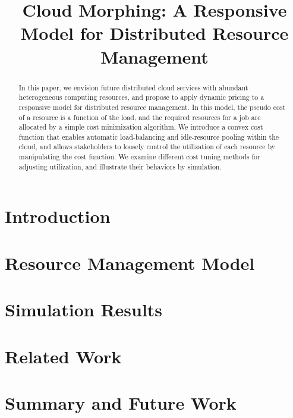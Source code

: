 \documentclass[10pt,sigconf,letterpaper,anonymous,nonacm]{acmart}
\title{Cloud Morphing: A Responsive Model for Distributed Resource Management}
\begin{document}
\begin{abstract}

    In this paper, we envision future distributed cloud services with
    abundant heterogeneous computing resources,
    and propose to apply dynamic pricing to a responsive model for
    distributed resource management.
    In this model, the pseudo cost of a resource is a function of the
    load, and the required resources for a job are allocated by a simple
    cost minimization algorithm.
    We introduce a convex cost function that enables automatic
    load-balancing and idle-resource pooling within the cloud, and allows
    stakeholders to loosely control the utilization of each resource by
    manipulating the cost function. We examine different cost tuning
    methods for adjusting utilization, and illustrate their behaviors by
    simulation.

\end{abstract}

\maketitle

\section{Introduction}



\section{Resource Management Model}



\section{Simulation Results}



\section{Related Work}



\section{Summary and Future Work}





\end{document}
